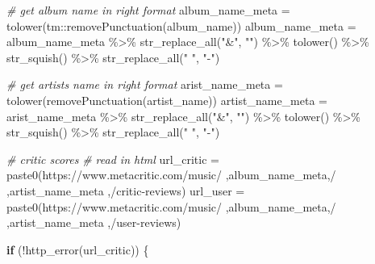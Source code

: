 \documentclass[
  11pt,
]{article}
\newenvironment{Shaded}{\begin{snugshade}}{\end{snugshade}}
\newcommand{\CommentTok}[1]{\textcolor[rgb]{0.56,0.35,0.01}{\textit{#1}}}
\newcommand{\ControlFlowTok}[1]{\textcolor[rgb]{0.13,0.29,0.53}{\textbf{#1}}}
\newcommand{\FunctionTok}[1]{\textcolor[rgb]{0.00,0.00,0.00}{#1}}
\newcommand{\NormalTok}[1]{#1}
\newcommand{\OtherTok}[1]{\textcolor[rgb]{0.56,0.35,0.01}{#1}}
\newcommand{\SpecialCharTok}[1]{\textcolor[rgb]{0.00,0.00,0.00}{#1}}
\newcommand{\StringTok}[1]{\textcolor[rgb]{0.31,0.60,0.02}{#1}}
\begin{document}
\begin{Shaded}
\begin{Highlighting}[]
\CommentTok{\# get album name in right format}
\NormalTok{album\_name\_meta }\OtherTok{=} \FunctionTok{tolower}\NormalTok{(tm}\SpecialCharTok{::}\FunctionTok{removePunctuation}\NormalTok{(album\_name))}
\NormalTok{album\_name\_meta }\OtherTok{=}\NormalTok{ album\_name\_meta }\SpecialCharTok{\%\textgreater{}\%}
  \FunctionTok{str\_replace\_all}\NormalTok{(}\StringTok{"\&"}\NormalTok{, }\StringTok{""}\NormalTok{) }\SpecialCharTok{\%\textgreater{}\%}
  \FunctionTok{tolower}\NormalTok{() }\SpecialCharTok{\%\textgreater{}\%}
  \FunctionTok{str\_squish}\NormalTok{() }\SpecialCharTok{\%\textgreater{}\%}
  \FunctionTok{str\_replace\_all}\NormalTok{(}\StringTok{" "}\NormalTok{, }\StringTok{"{-}"}\NormalTok{)}

\CommentTok{\# get artists name in right format}
\NormalTok{arist\_name\_meta }\OtherTok{=} \FunctionTok{tolower}\NormalTok{(}\FunctionTok{removePunctuation}\NormalTok{(artist\_name))}
\NormalTok{artist\_name\_meta }\OtherTok{=}\NormalTok{ arist\_name\_meta }\SpecialCharTok{\%\textgreater{}\%}
  \FunctionTok{str\_replace\_all}\NormalTok{(}\StringTok{"\&"}\NormalTok{, }\StringTok{""}\NormalTok{) }\SpecialCharTok{\%\textgreater{}\%}
  \FunctionTok{tolower}\NormalTok{() }\SpecialCharTok{\%\textgreater{}\%}
  \FunctionTok{str\_squish}\NormalTok{() }\SpecialCharTok{\%\textgreater{}\%}
  \FunctionTok{str\_replace\_all}\NormalTok{(}\StringTok{" "}\NormalTok{, }\StringTok{"{-}"}\NormalTok{)}

\CommentTok{\# critic scores}
\CommentTok{\# read in html}
\NormalTok{url\_critic }\OtherTok{=} \FunctionTok{paste0}\NormalTok{(}\StringTok{\textquotesingle{}https://www.metacritic.com/music/\textquotesingle{}}
\NormalTok{              ,album\_name\_meta,}\StringTok{\textquotesingle{}/\textquotesingle{}}
\NormalTok{              ,artist\_name\_meta}
\NormalTok{              ,}\StringTok{\textquotesingle{}/critic{-}reviews\textquotesingle{}}\NormalTok{)}
\NormalTok{url\_user   }\OtherTok{=} \FunctionTok{paste0}\NormalTok{(}\StringTok{\textquotesingle{}https://www.metacritic.com/music/\textquotesingle{}}
\NormalTok{              ,album\_name\_meta,}\StringTok{\textquotesingle{}/\textquotesingle{}}
\NormalTok{              ,artist\_name\_meta}
\NormalTok{              ,}\StringTok{\textquotesingle{}/user{-}reviews\textquotesingle{}}\NormalTok{)}

\ControlFlowTok{if}\NormalTok{ (}\SpecialCharTok{!}\FunctionTok{http\_error}\NormalTok{(url\_critic)) \{}
  

\end{Highlighting}
\end{Shaded}
\end{document}

